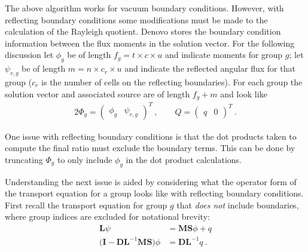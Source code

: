 \documentclass[12pt, letterpaper]{article}
\newcommand{\ve}[1]{\ensuremath{\mathbf{#1}}}
\begin{document}
The above algorithm works for vacuum boundary conditions. However, with reflecting boundary conditions some modifications must be made to the calculation of the Rayleigh quotient. Denovo stores the boundary condition information between the flux moments in the solution vector. For the following discussion let $\phi_{g}$ be of length $f_{g} = t \times c \times u$ and indicate moments for group $g$; let $\psi_{r,g}$ be of length $m = n \times c_{r} \times u$ and indicate the reflected angular flux for that group ($c_{r}$ is the number of cells on the reflecting boundaries). For each group the solution vector and associated source are of length $f_{g} + m$ and look like
%
\begin{alignat}{2}
 \Phi_{g} = \begin{pmatrix} \phi_{g} & \psi_{r,g} \end{pmatrix}^{T} \:, \qquad Q = \begin{pmatrix} q & 0 \end{pmatrix}^{T} \:.
\label{eq:reflFlux}
\end{alignat}

One issue with reflecting boundary conditions is that the dot products taken to compute the final ratio must exclude the boundary terms. This can be done by truncating $\Phi_{g}$ to only include $\phi_{g}$ in the dot product calculations. 

Understanding the next issue is aided by considering what the operator form of the transport equation for a group looks like with reflecting boundary conditions. First recall the transport equation for group $g$ that \emph{does not} include boundaries, where group indices are excluded for notational brevity:
%
\begin{align}
  \mathbf{L} \psi &= \mathbf{MS}\phi + q
  \label{eq:transport} \\
  \bigl(\ve{I} - \ve{DL}^{-1}\ve{MS} \bigr) \phi &= \ve{DL}^{-1}q \:.
  \label{eq:transportMoments}
\end{align}
\end{document}
